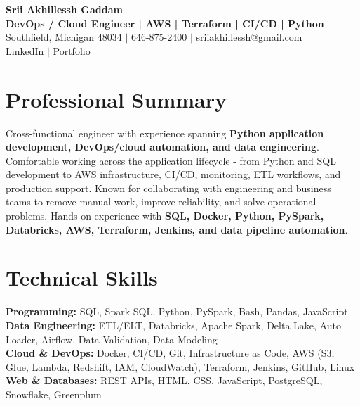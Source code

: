 \documentclass[letterpaper,10pt]{article}
\begin{document}
\fontsize{9.35pt}{10.45pt}\selectfont

\begin{center}
    {\LARGE \textbf{Srii Akhillessh Gaddam}} \\[-1pt]
    \textbf{DevOps / Cloud Engineer | AWS | Terraform | CI/CD | Python} \\[2pt]
    Southfield, Michigan 48034 $|$
    \href{tel:6468752400}{646-875-2400} $|$
    \href{mailto:sriiakhillessh@gmail.com}{sriiakhillessh@gmail.com} \\[1pt]
    \href{https://www.linkedin.com/in/srii-akhiilessh-gaddam-b48668191/}{LinkedIn} $|$
    \href{https://sriiakhillesshg.github.io/portfolio/}{Portfolio}
\end{center}
\vspace{-8pt}

\section{Professional Summary}
\small{Cross-functional engineer with experience spanning \textbf{Python application development, DevOps/cloud automation, and data engineering}. Comfortable working across the application lifecycle - from Python and SQL development to AWS infrastructure, CI/CD, monitoring, ETL workflows, and production support. Known for collaborating with engineering and business teams to remove manual work, improve reliability, and solve operational problems. Hands-on experience with \textbf{SQL, Docker, Python, PySpark, Databricks, AWS, Terraform, Jenkins, and data pipeline automation}.}

\section{Technical Skills}
\small{
\textbf{Programming:} SQL, Spark SQL, Python, PySpark, Bash, Pandas, JavaScript \\
\textbf{Data Engineering:} ETL/ELT, Databricks, Apache Spark, Delta Lake, Auto Loader, Airflow, Data Validation, Data Modeling \\
\textbf{Cloud \& DevOps:} Docker, CI/CD, Git, Infrastructure as Code, AWS (S3, Glue, Lambda, Redshift, IAM, CloudWatch), Terraform, Jenkins, GitHub, Linux \\
\textbf{Web \& Databases:} REST APIs, HTML, CSS, JavaScript, PostgreSQL, Snowflake, Greenplum
}
\end{document}
